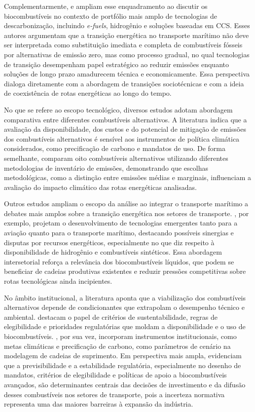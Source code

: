 Complementarmente, \citet{kass_understanding_2018} e \citet{mukherjee_perspective_2020} ampliam esse enquadramento ao discutir os biocombustíveis no contexto de portfólio mais amplo de tecnologias de descarbonização, incluindo \emph{e-fuels}, hidrogênio e soluções baseadas em \gls{CCS}. Esses autores argumentam que a transição energética no transporte marítimo não deve ser interpretada como substituição imediata e completa de combustíveis fósseis por alternativas de emissão zero, mas como processo gradual, no qual tecnologias de transição desempenham papel estratégico ao reduzir emissões enquanto soluções de longo prazo amadurecem técnica e economicamente. Essa perspectiva dialoga diretamente com a abordagem de transições sociotécnicas e com a ideia de coexistência de rotas energéticas ao longo do tempo.

No que se refere ao escopo tecnológico, diversos estudos adotam abordagem comparativa entre diferentes combustíveis alternativos. A literatura indica que a avaliação da disponibilidade, dos custos e do potencial de mitigação de emissões dos combustíveis alternativos é sensível aos instrumentos de política climática considerados, como precificação de carbono e mandatos de uso. De forma semelhante, \citet{krantz_assessing_2023} comparam oito combustíveis alternativos utilizando diferentes metodologias de inventário de emissões, demonstrando que escolhas metodológicas, como a distinção entre emissões médias e marginais, influenciam a avaliação do impacto climático das rotas energéticas analisadas.

Outros estudos ampliam o escopo da análise ao integrar o transporte marítimo a debates mais amplos sobre a transição energética nos setores de transporte. \citet{arias_assessing_2024}, por exemplo, projetam o desenvolvimento de tecnologias emergentes tanto para a aviação quanto para o transporte marítimo, destacando possíveis sinergias e disputas por recursos energéticos, especialmente no que diz respeito à disponibilidade de hidrogênio e combustíveis sintéticos. Essa abordagem intersetorial reforça a relevância dos biocombustíveis líquidos, que podem se beneficiar de cadeias produtivas existentes e reduzir pressões competitivas sobre rotas tecnológicas ainda incipientes.

No âmbito institucional, a literatura aponta que a viabilização dos combustíveis alternativos depende de condicionantes que extrapolam o desempenho técnico e ambiental. \citet{prussi_potential_2021} destacam o papel de critérios de sustentabilidade, regras de elegibilidade e prioridades regulatórias que moldam a disponibilidade e o uso de biocombustíveis. \citet{harahap_renewable_2023}, por sua vez, incorporam instrumentos institucionais, como metas climáticas e precificação de carbono, como parâmetros de cenário na modelagem de cadeias de suprimento. Em perspectiva mais ampla, \citet{irena_advanced_2019} evidenciam que a previsibilidade e a estabilidade regulatória, especialmente no desenho de mandatos, critérios de elegibilidade e políticas de apoio a biocombustíveis avançados, são determinantes centrais das decisões de investimento e da difusão desses combustíveis nos setores de transporte, pois a incerteza normativa representa uma das maiores barreiras à expansão da indústria.


